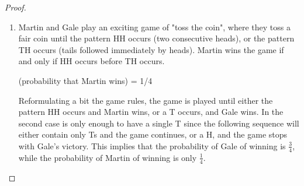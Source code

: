 \begin{proof}
\begin{enumerate}
        \item Martin and Gale play an exciting game of "toss the coin", where they toss a fair coin until the pattern HH occurs (two consecutive heads), or the pattern TH occurs (tails followed immediately by heads). Martin wins the game if and only if HH occurs before TH occurs.

        (probability that Martin wins) = 1/4

        Reformulating a bit the game rules, the game is played until either the pattern HH occurs and Martin wins, or a T occurs, and Gale wins. In the second case is only enough to have a single T since the following sequence will either contain only Ts and the game continues, or a H, and the game stops with Gale's victory. This implies that the probability of Gale of winning is $\frac{3}{4}$, while the probability of Martin of winning is only $\frac{1}{4}$.
    \end{enumerate}
\end{proof}


